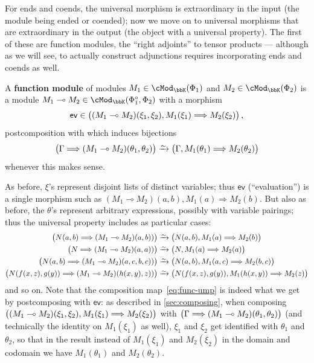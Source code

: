 \documentclass{amsart}
\newcommand{\K}{\bbK}
\let\mod\cMod
\def\modk{\mod_\K}
\renewcommand{\o}{^{\circ}}
\let\vdash\Longrightarrow
\let\mto\vdash    %
\def\mhom#1#2{\left( #1 \vphantom{\big|}\mto #2 \right)}
\newcommand{\ev}{\mathsf{ev}}
\begin{document}
For ends and coends, the universal morphism is extraordinary in the input (the module being ended or coended); now we move on to universal morphisms that are extraordinary in the output (the object with a universal property).
The first of these are function modules, the ``right adjoints'' to tensor products --- although as we will see, to actually construct adjunctions requires incorporating ends and coends as well.

\begin{defn}
  A \textbf{function module} of modules $M_1\in \modk(\Phi_1)$ and $M_2\in \modk(\Phi_2)$ is a module $M_1\multimap M_2 \in \modk(\Phi_1\o,\Phi_2)$ with a morphism
  \[\ev \in \mhom{(M_1\multimap M_2)(\xi_1,\xi_2), M_1(\xi_1)}{M_2(\xi_2)},\]
  postcomposition with which induces bijections
  \begin{equation}
    \mhom{\Gamma}{(M_1\multimap M_2)(\theta_1,\theta_2)} \toiso
    \mhom{\Gamma,M_1(\theta_1)}{M_2(\theta_2)}\label{eq:func-ump}
  \end{equation}
  whenever this makes sense.
\end{defn}

As before, $\xi$'s represent disjoint lists of distinct variables; thus $\ev$ (``evaluation'') is a single morphism such as $(M_1\multimap M_2)(a,b), M_1(a) \mto M_2(b)$.
But also as before, the $\theta$'s represent arbitrary expressions, possibly with variable pairings; thus the universal property includes as particular cases:
\begin{align*}
  \mhom{N(a,b)}{(M_1\multimap M_2)(a,b))} &\toiso \mhom{N(a,b),M_1(a)}{M_2(b)}\\
  \mhom{N}{(M_1\multimap M_2)(a,a))} &\toiso \mhom{N,M_1(a)}{M_2(a)}\\
  \mhom{N(a,b)}{(M_1\multimap M_2)(a,c,b,c))} &\toiso \mhom{N(a,b),M_1(a,c)}{M_2(b,c)}\\
  \mhom{N(f(x,z),g(y))}{(M_1\multimap M_2)(h(x,y),z))} &\toiso \mhom{N(f(x,z),g(y)),M_1(h(x,y))}{M_2(z)}
\end{align*}
and so on.
Note that the composition map~\eqref{eq:func-ump} is indeed what we get by postcomposing with $\ev$: as described in \cref{sec:composing}, when composing $\mhom{(M_1\multimap M_2)(\xi_1,\xi_2), M_1(\xi_1)}{M_2(\xi_2)}$ with $\mhom{\Gamma}{(M_1\multimap M_2)(\theta_1,\theta_2)}$ (and technically the identity on $M_1(\xi_1)$ as well), $\xi_1$ and $\xi_2$ get identified with $\theta_1$ and $\theta_2$, so that in the result instead of $M_1(\xi_1)$ and $M_2(\xi_2)$ in the domain and codomain we have $M_1(\theta_1)$ and $M_2(\theta_2)$.
\end{document}
